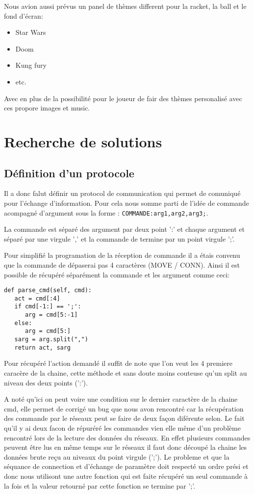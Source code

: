 \documentclass[12pt]{report}
\begin{document}
Nous avion aussi prévus un panel de thèmes different pour la racket, la ball et
le fond d'écran:
\begin{itemize}
\item Star Wars
\item Doom
\item Kung fury
\item etc.
\end{itemize}
Avec en plus de la possibilité pour le joueur de fair des thèmes personalisé
avec ces propore images et music.

\part{Recherche de solutions}
\chapter{Définition d'un protocole}
Il a donc falut définir un protocol de communication qui permet de comuniqué
pour l'échange d'information.
Pour cela nous somme parti de l'idée de commande acompagné d'argument sous la
forme : \texttt{COMMANDE:arg1,arg2,arg3;}.

La commande est séparé des argument par deux point ':' et chaque argument et
séparé par une virgule ',' et la commande de termine par un point virgule ';'.

Pour simplifié la programation de la réception de commande il a étais convenu
que la commande de dépaserai pas 4 caractères (MOVE / CONN). Ainsi il est
possible de récupéré séparément la commande et les argument comme ceci:
\begin{verbatim}
def parse_cmd(self, cmd):
   act = cmd[:4]
   if cmd[-1:] == ';':
      arg = cmd[5:-1]
   else:
      arg = cmd[5:]
   sarg = arg.split(",")
   return act, sarg
\end{verbatim}

Pour récupéré l'action demandé il suffit de note que l'on veut les 4 premiere
caracère de la chaine, cette méthode et sans doute moins couteuse qu'un split
au niveau des deux points (':').

A noté qu'ici on peut voire une condition sur le dernier caractère de la chaine
cmd, elle permet de corrigé un bug que nous avon rencontré car la récupération
des commande par le réseaux peut se faire de deux façon diférente selon.
Le fait qu'il y ai deux facon de répuréré les commandes vien elle même d'un
problème rencontré lors de la lecture des données du réseaux. En effet
plusieurs commandes peuvent être lus en même temps sur le réseaux il faut
donc découpé la chaine les données brute reçu au niveaux du point virgule
(';').
Le probleme et que la séquance de connection et d'échange de paramètre doit
respecté un ordre prési et donc nous utilisont une autre fonction qui est
faite récupéré un seul commande à la fois et la valeur retourné par cette
fonction se termine par ';'.
\end{document}
